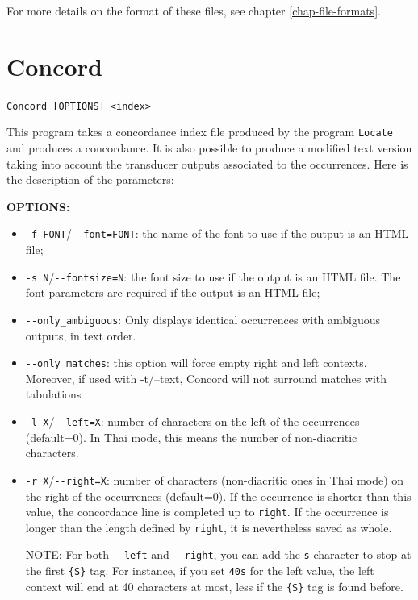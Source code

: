 \bigskip
\noindent For more details on the format of these files, see chapter
\ref{chap-file-formats}.






\section{Concord}
\verb+Concord [OPTIONS] <index>+

\bigskip
\noindent This program takes a concordance index file produced by the program
\verb+Locate+ and produces a concordance. It is also possible to produce a
modified text version taking into account the transducer outputs associated to
the occurrences. Here is the description of the parameters:

\bigskip
\noindent \textbf{OPTIONS:}
\begin{itemize}
  \item \verb+-f FONT+/\verb+--font=FONT+: the name of the font to use if the
  output is an HTML file;
  \item \verb+-s N+/\verb+--fontsize=N+: the font size to use if the output is
  an HTML file. The font parameters are required if the output is an HTML file;
  \item \verb+--only_ambiguous+: Only displays identical occurrences with 
  ambiguous outputs, in text order.
  \item \verb+--only_matches+: this option will force empty right and left contexts.
  Moreover, if used with -t/--text, Concord will not surround matches with tabulations
  \item \verb+-l X+/\verb+--left=X+: number of characters on the left of the 
  occurrences (default=0). In Thai mode, this means the number of non-diacritic
  characters.
  \item \verb+-r X+/\verb+--right=X+: number of characters (non-diacritic ones in Thai mode) on
  the right of the occurrences (default=0). If the occurrence is shorter than
  this value, the concordance line is completed up to \verb+right+. If the occurrence is longer
  than the length defined by \verb+right+, it is nevertheless saved as whole.
  
  \bigskip
  NOTE: For both \verb+--left+ and \verb+--right+, you can add the \verb+s+
  character to stop at the first \verb+{S}+ tag. For instance, if you
  set \verb+40s+ for the left value, the left context will end at 40 characters
  at most, less if the \verb+{S}+ tag is found before.
\end{itemize}

